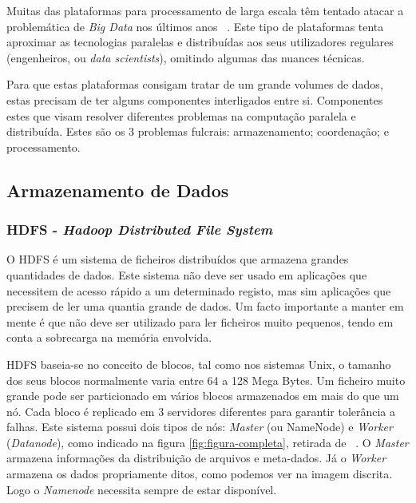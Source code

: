 Muitas das plataformas para processamento de larga escala têm tentado atacar a problemática de \textit{Big Data} nos últimos anos ~\cite{fernandez2014big}. Este tipo de plataformas tenta aproximar as tecnologias paralelas e distribuídas aos seus utilizadores regulares (engenheiros, ou \textit{data scientists}), omitindo algumas das nuances técnicas.

Para que estas plataformas consigam tratar de um grande volumes de dados, estas precisam de ter alguns componentes interligados entre si. Componentes estes que visam resolver diferentes problemas na computação paralela e distribuída. Estes são os 3 problemas fulcrais: armazenamento; coordenação; e processamento. 

\subsection{Armazenamento de Dados}

\subsubsection{HDFS - \textit{Hadoop Distributed File System}}
O HDFS \cite{hdfs} é um sistema de ficheiros distribuídos que armazena grandes quantidades de dados. Este sistema não deve ser usado em aplicações que necessitem de acesso rápido a um determinado registo, mas sim aplicações que precisem de ler uma quantia grande de dados. Um facto importante a manter em mente é que não deve ser utilizado para ler ficheiros muito pequenos, tendo em conta a sobrecarga na memória envolvida.

HDFS baseia-se no conceito de blocos, tal como nos sistemas Unix, o tamanho dos seus blocos normalmente varia entre 64 a 128 Mega Bytes. Um ficheiro muito grande pode ser particionado em vários blocos armazenados em mais do que um nó. Cada bloco é replicado em 3 servidores diferentes para garantir tolerância a falhas. Este sistema possui dois tipos de nós: \textit{Master} (ou NameNode) e \textit{Worker} (\textit{Datanode}), como indicado na figura \ref{fig:figura-completa}, retirada de ~\cite{lin2010data}. O \textit{Master} armazena informações da distribuição de arquivos e meta-dados. Já o \textit{Worker} armazena os dados propriamente ditos, como podemos ver na imagem discrita. Logo o \textit{Namenode} necessita sempre de estar disponível.

